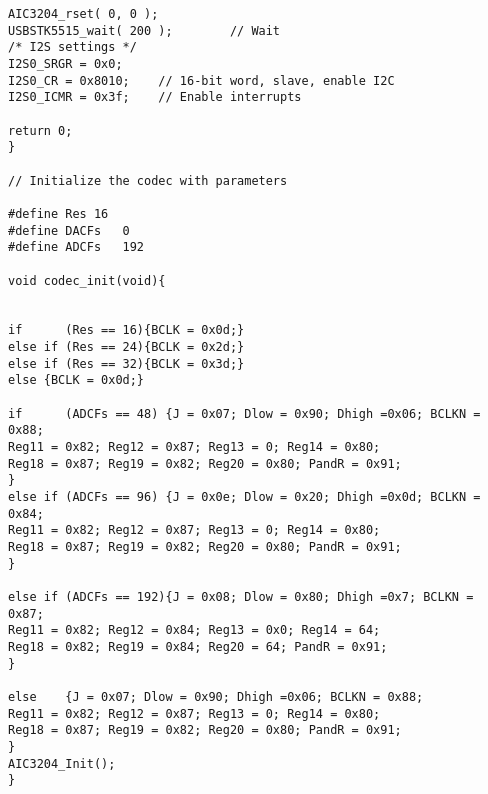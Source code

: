 \begin{lstlisting}
AIC3204_rset( 0, 0 );    
USBSTK5515_wait( 200 );        // Wait
/* I2S settings */
I2S0_SRGR = 0x0;
I2S0_CR = 0x8010;    // 16-bit word, slave, enable I2C
I2S0_ICMR = 0x3f;    // Enable interrupts

return 0;
}

// Initialize the codec with parameters

#define Res	16
#define DACFs	0
#define ADCFs	192

void codec_init(void){


if 		(Res == 16){BCLK = 0x0d;}
else if (Res == 24){BCLK = 0x2d;}
else if (Res == 32){BCLK = 0x3d;}
else {BCLK = 0x0d;}

if 		(ADCFs == 48) {J = 0x07; Dlow = 0x90; Dhigh =0x06; BCLKN = 0x88;
Reg11 = 0x82; Reg12 = 0x87; Reg13 = 0; Reg14 = 0x80; 	
Reg18 = 0x87; Reg19 = 0x82; Reg20 = 0x80; PandR = 0x91;
}
else if	(ADCFs == 96) {J = 0x0e; Dlow = 0x20; Dhigh =0x0d; BCLKN = 0x84;
Reg11 = 0x82; Reg12 = 0x87; Reg13 = 0; Reg14 = 0x80;
Reg18 = 0x87; Reg19 = 0x82; Reg20 = 0x80; PandR = 0x91;
}

else if (ADCFs == 192){J = 0x08; Dlow = 0x80; Dhigh =0x7; BCLKN = 0x87; 
Reg11 = 0x82; Reg12 = 0x84; Reg13 = 0x0; Reg14 = 64; 	
Reg18 = 0x82; Reg19 = 0x84; Reg20 = 64; PandR = 0x91;
}	

else 	{J = 0x07; Dlow = 0x90; Dhigh =0x06; BCLKN = 0x88;
Reg11 = 0x82; Reg12 = 0x87; Reg13 = 0; Reg14 = 0x80; 	
Reg18 = 0x87; Reg19 = 0x82; Reg20 = 0x80; PandR = 0x91;
}
AIC3204_Init();
}
\end{lstlisting}